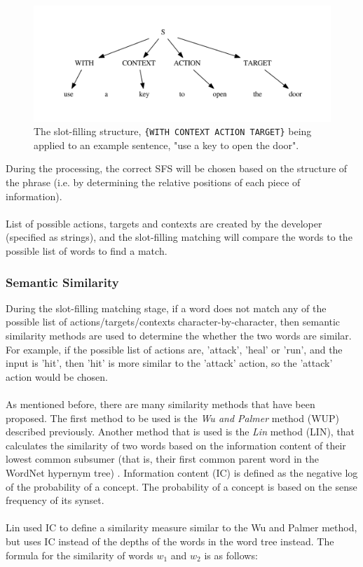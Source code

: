 \documentclass[12pt]{article}
\begin{document}
\begin{center}
\begin{figure}[H]
\begin{center}
  \includegraphics[width=\linewidth]{sfs-2.pdf}
  \caption{The slot-filling structure, \texttt{\{WITH CONTEXT ACTION TARGET\}} being applied to an example sentence, "use a key to open the door".}
  \label{fig:sfs-2}
  \end{center}
\end{figure}
\end{center}

During the processing, the correct SFS will be chosen based on the structure of the phrase (i.e. by determining the relative positions of each piece of information).
\\
\\
List of possible actions, targets and contexts are created by the developer (specified as strings), and the slot-filling matching will compare the words to the possible list of words to find a match.

\subsubsection{Semantic Similarity}
\label{semantic-sim-design}

During the slot-filling  matching stage, if a word does not match any of the possible list of actions/targets/contexts character-by-character, then semantic similarity methods are used to determine the whether the two words are similar. For example, if the possible list of actions are, 'attack', 'heal' or 'run', and the input is 'hit', then 'hit' is more similar to the 'attack' action, so the 'attack' action would be chosen.
\\
\\
As mentioned before, there are many similarity methods that have been proposed. The first method to be used is the \textit{Wu and Palmer} method (WUP) described previously. Another method that is used is the \textit{Lin} method (LIN), that calculates the similarity of two words based on the information content of their lowest common subsumer (that is, their first common parent word in the WordNet hypernym tree) \cite{RefWorks:46}. Information content (IC) is defined as the negative log of the probability of a concept. The probability of a concept is based on the sense frequency of its synset.
\\
\\
Lin used IC to define a similarity measure similar to the Wu and Palmer method, but uses IC instead of the depths of the words in the word tree instead. The formula for the similarity of words $w_1$ and $w_2$ is as follows:
\end{document}
